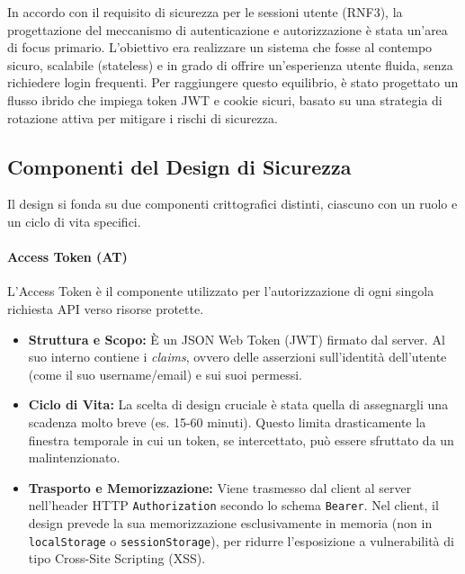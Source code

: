 \documentclass[12pt,a4paper,openright,twoside]{book}
\begin{document}
In accordo con il requisito di sicurezza per le sessioni utente (RNF3), la progettazione del meccanismo di autenticazione e autorizzazione è stata un'area di focus primario. L'obiettivo era realizzare un sistema che fosse al contempo sicuro, scalabile (stateless) e in grado di offrire un'esperienza utente fluida, senza richiedere login frequenti. Per raggiungere questo equilibrio, è stato progettato un flusso ibrido che impiega token JWT e cookie sicuri, basato su una strategia di rotazione attiva per mitigare i rischi di sicurezza.

\subsection{Componenti del Design di Sicurezza}
Il design si fonda su due componenti crittografici distinti, ciascuno con un ruolo e un ciclo di vita specifici.

\paragraph{Access Token (AT)}
L'Access Token è il componente utilizzato per l'autorizzazione di ogni singola richiesta API verso risorse protette.
\begin{itemize}
    \item \textbf{Struttura e Scopo:} È un JSON Web Token (JWT) firmato dal server. Al suo interno contiene i \textit{claims}, ovvero delle asserzioni sull'identità dell'utente (come il suo username/email) e sui suoi permessi.
    \item \textbf{Ciclo di Vita:} La scelta di design cruciale è stata quella di assegnargli una scadenza molto breve (es. 15-60 minuti). Questo limita drasticamente la finestra temporale in cui un token, se intercettato, può essere sfruttato da un malintenzionato.
    \item \textbf{Trasporto e Memorizzazione:} Viene trasmesso dal client al server nell'header HTTP \texttt{Authorization} secondo lo schema \texttt{Bearer}. Nel client, il design prevede la sua memorizzazione esclusivamente in memoria (non in \texttt{localStorage} o \texttt{sessionStorage}), per ridurre l'esposizione a vulnerabilità di tipo Cross-Site Scripting (XSS).
\end{itemize}
\end{document}

